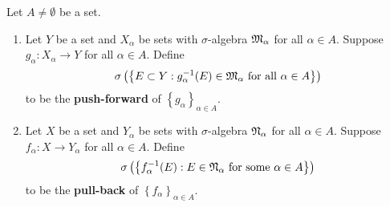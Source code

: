 \documentclass[a4paper]{article}
\begin{document}
\begin{defi}
  Let $A \neq \emptyset$ be a set. 
  \begin{enumerate}
    \item Let $Y$ be a set and $X_\alpha$ be sets 
    with $\sigma$-algebra $\mathfrak{M}_\alpha$ for all 
    $\alpha \in A$. Suppose $g_\alpha : X_\alpha 
    \to Y$ for all $\alpha \in A$. Define 
    \[
    \sigma \left( \left\{ E \subset Y: g_\alpha^{-1}(E)
    \in \mathfrak{M}_\alpha \text{ for all $\alpha \in A$} 
    \right\} \right)
    \]
    to be the \textbf{push-forward} of $\left\{ g_\alpha 
    \right\}_{\alpha \in A}$.

    \item Let $X$ be a set and $Y_\alpha$ be sets with 
    $\sigma$-algebra $\mathfrak{N}_\alpha$ for all $\alpha \in A$.
    Suppose $f_\alpha : X \to Y_\alpha$ for all $\alpha \in 
    A$. Define 
    \[
    \sigma \left( \left\{ f_\alpha^{-1}(E) : 
    E \in \mathfrak{N}_\alpha \text{ for some $\alpha \in A$} 
    \right\} \right)
    \]
    to be the \textbf{pull-back} of $\left\{ f_\alpha
     \right\}_{\alpha \in A}$.
  \end{enumerate}
\end{defi}
\end{document}
